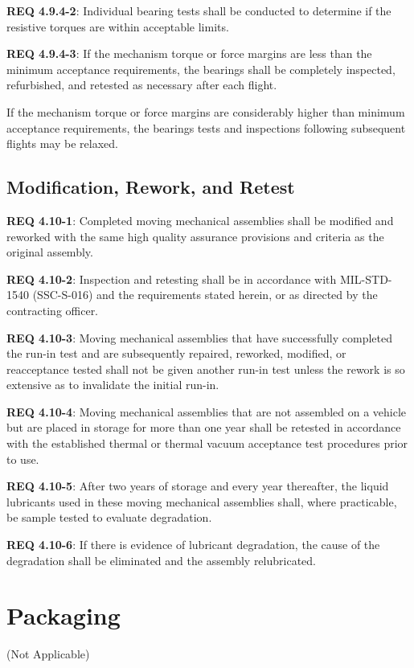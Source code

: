 \documentclass[12pt]{article}
\begin{document}
\noindent \textbf{REQ 4.9.4-2}: Individual bearing tests shall be conducted to determine if the resistive torques are within acceptable limits. 

\noindent \textbf{REQ 4.9.4-3}: If the mechanism torque or force margins are less than the minimum acceptance requirements, the bearings shall be completely inspected, refurbished, and retested as necessary after each flight. 

If the mechanism torque or force margins are considerably higher than minimum acceptance requirements, the bearings tests and inspections following subsequent flights may be relaxed.


\subsection{Modification, Rework, and Retest} %
\noindent \textbf{REQ 4.10-1}: Completed moving mechanical assemblies shall be modified and reworked with the same high quality assurance provisions and criteria as the original assembly. 

\noindent \textbf{REQ 4.10-2}: Inspection and retesting shall be in accordance with MIL-STD-1540 (SSC-S-016) and the requirements stated herein, or as directed by the contracting officer. 

\noindent \textbf{REQ 4.10-3}: Moving mechanical assemblies that have successfully completed the run-in test and are subsequently repaired, reworked, modified, or reacceptance tested shall not be given another run-in test unless the rework is so extensive as to invalidate the initial run-in. 

\noindent \textbf{REQ 4.10-4}: Moving mechanical assemblies that are not assembled on a vehicle but are placed in storage for more than one year shall be retested in accordance with the established thermal or thermal vacuum acceptance test procedures prior to use.
 
\noindent \textbf{REQ 4.10-5}: After two years of storage and every year thereafter, the liquid lubricants used in these moving mechanical assemblies shall, where practicable, be sample tested to evaluate degradation. 

\noindent \textbf{REQ 4.10-6}: If there is evidence of lubricant degradation, the cause of the degradation shall be eliminated and the assembly relubricated.


\clearpage
\section{Packaging} (Not Applicable)
\end{document}
